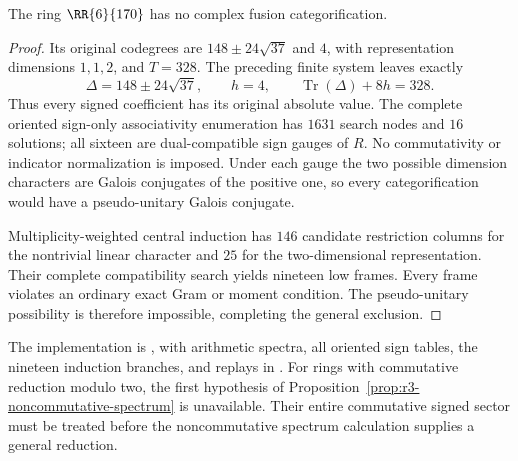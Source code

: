 \begin{theorem}\label{thm:r3-noncommutative-exclusion}
The ring $\RR{6}{170}$ has no complex fusion categorification.
\end{theorem}
\begin{proof}
Its original codegrees are $148\pm24\sqrt{37}$ and $4$, with
representation dimensions $1,1,2$, and $T=328$.
The preceding finite system leaves exactly
\[
 \Delta=148\pm24\sqrt{37},\qquad h=4,
 \qquad \operatorname{Tr}(\Delta)+8h=328.
\]
Thus every signed coefficient has its original absolute value.
The complete oriented sign-only associativity enumeration has
$1631$ search nodes and $16$ solutions; all sixteen are
dual-compatible sign gauges of $R$. No commutativity or indicator
normalization is imposed. Under each gauge the two possible
dimension characters are Galois conjugates of the positive one,
so every categorification would have a pseudo-unitary Galois
conjugate.

Multiplicity-weighted central induction has $146$ candidate
restriction columns for the nontrivial linear character and $25$
for the two-dimensional representation. Their complete compatibility
search yields nineteen low frames. Every frame violates an ordinary
exact Gram or moment condition. The pseudo-unitary possibility is
therefore impossible, completing the general exclusion.
\end{proof}

The implementation is ,
with arithmetic spectra, all oriented sign tables, the nineteen
induction branches, and replays in
.
For rings with commutative reduction modulo two, the first hypothesis
of Proposition~\ref{prop:r3-noncommutative-spectrum} is unavailable.
Their entire commutative signed sector must be treated before the
noncommutative spectrum calculation supplies a general reduction.


